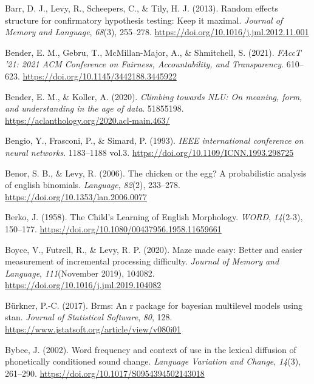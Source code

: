 \documentclass[
  12pt,
  letterpaper,
]{scrreport}
\newlength{\cslhangindent}
\newenvironment{CSLReferences}[2] %
 {\begin{list}{}{%
  \setlength{\itemindent}{0pt}
  \setlength{\leftmargin}{0pt}
  \setlength{\parsep}{0pt}
  \ifodd #1
   \setlength{\leftmargin}{\cslhangindent}
   \setlength{\itemindent}{-1\cslhangindent}
  \fi
  \setlength{\itemsep}{#2\baselineskip}}}
 {\end{list}}
\begin{document}
\begin{CSLReferences}{1}{0}
Barr, D. J., Levy, R., Scheepers, C., \& Tily, H. J. (2013). Random
effects structure for confirmatory hypothesis testing: Keep it maximal.
\emph{Journal of Memory and Language}, \emph{68}(3), 255--278.
\url{https://doi.org/10.1016/j.jml.2012.11.001}

Bender, E. M., Gebru, T., McMillan-Major, A., \& Shmitchell, S. (2021).
\emph{FAccT '21: 2021 ACM Conference on Fairness, Accountability, and
Transparency}. 610--623. \url{https://doi.org/10.1145/3442188.3445922}

Bender, E. M., \& Koller, A. (2020). \emph{Climbing towards NLU: On
meaning, form, and understanding in the age of data}. 51855198.
\url{https://aclanthology.org/2020.acl-main.463/}

Bengio, Y., Frasconi, P., \& Simard, P. (1993). \emph{IEEE international
conference on neural networks}. 1183--1188 vol.3.
\url{https://doi.org/10.1109/ICNN.1993.298725}

Benor, S. B., \& Levy, R. (2006). The chicken or the egg? A
probabilistic analysis of english binomials. \emph{Language},
\emph{82}(2), 233--278. \url{https://doi.org/10.1353/lan.2006.0077}

Berko, J. (1958). The Child's Learning of English Morphology.
\emph{{\emph{WORD}}}, \emph{14}(2-3), 150--177.
\url{https://doi.org/10.1080/00437956.1958.11659661}

Boyce, V., Futrell, R., \& Levy, R. P. (2020). Maze made easy: Better
and easier measurement of incremental processing difficulty.
\emph{Journal of Memory and Language}, \emph{111}(November 2019),
104082. \url{https://doi.org/10.1016/j.jml.2019.104082}

Bürkner, P.-C. (2017). Brms: An r package for bayesian multilevel models
using stan. \emph{Journal of Statistical Software}, \emph{80}, 128.
\url{https://www.jstatsoft.org/article/view/v080i01}

Bybee, J. (2002). Word frequency and context of use in the lexical
diffusion of phonetically conditioned sound change. \emph{Language
Variation and Change}, \emph{14}(3), 261--290.
\url{https://doi.org/10.1017/S0954394502143018}


\end{CSLReferences}
\end{document}
